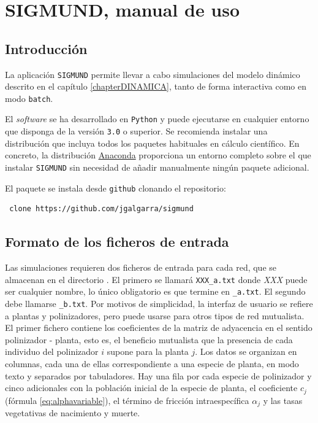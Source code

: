 
\appendix
\renewcommand{\thechapter}{A}
\chapter{SIGMUND, manual de uso} %

\label{APP_SIGMUNDMAN} %

\section{Introducción}

La aplicación \texttt{SIGMUND} permite llevar a cabo simulaciones del modelo dinámico descrito en el capítulo \ref{chapterDINAMICA}, tanto de forma interactiva como en modo \texttt{batch}.

El \textit{software} se ha desarrollado en \texttt{Python} y puede ejecutarse en cualquier entorno que disponga de la versión \texttt{3.0} o superior. Se recomienda instalar una distribución que incluya todos los paquetes habituales en cálculo científico. En concreto, la distribución \href{https://www.continuum.io/}{Anaconda} proporciona un entorno completo sobre el que instalar \texttt{SIGMUND} sin necesidad de añadir manualmente ningún paquete adicional.

El paquete se instala desde \texttt{github} clonando el repositorio:

\fontsize{3.5mm}{3.5mm}\selectfont
\begin{verbatim}
 clone https://github.com/jgalgarra/sigmund 
\end{verbatim}
\normalsize
%
 
\section{Formato de los ficheros de entrada}
\label{sec:ASIGMUNDMAN_input_file_format}

Las simulaciones requieren dos ficheros de entrada para cada red, que se almacenan en el directorio . El primero se llamará \texttt{XXX\_a.txt} donde \textit{XXX} puede ser cualquier nombre, lo único obligatorio es que termine en \texttt{\_a.txt}. El segundo debe llamarse \texttt{\_b.txt}. Por motivos de simplicidad, la interfaz de usuario se refiere a plantas y polinizadores, pero puede usarse para otros tipos de red mutualista.
El primer fichero contiene los coeficientes de la matriz de adyacencia en el sentido polinizador - planta, esto es, el beneficio mutualista que la presencia de cada individuo del polinizador $i$ supone para la planta $j$. Los datos se organizan en columnas, cada una de ellas correspondiente a una especie de planta, en modo texto y separados por tabuladores. Hay una fila por cada especie de polinizador y cinco adicionales con la población inicial de la especie de planta, el coeficiente $c_{j}$ (fórmula \ref{eq:alphavariable}), el término de fricción intraespecífica $\alpha_{j}$ y las tasas vegetativas de nacimiento y muerte.

